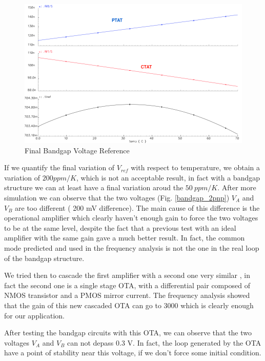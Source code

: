 \documentclass[11pt,a4paper]{report}
\begin{document}
\begin{figure}[h]
  \begin{center}
    \includegraphics[scale=0.4]{photo/PTAT_CTAT_F}
  \end{center}
  \caption{Final Bandgap Voltage Reference}
\end{figure} 

If we quantify the final variation of $V_{ref}$ with respect to temperature, we obtain a variation of $200 ppm/K$, which is not an acceptable result, in fact with a bandgap structure we can at least have a final variation aroud the $50~ppm/K$.
After more simulation we can observe that the two voltages (Fig. \ref{bandgap_2pnp}) $V_A$ and $V_B$ are too different  ( 200 mV difference). The main cause of this difference is the operational amplifier which clearly haven't enough gain to force the two voltages to be at the same level, despite the fact that a previous test with an ideal amplifier with the same gain gave a much better result. In fact, the common mode predicted and used in the frequency analysis is not the one in the real loop of the bandgap structure.

We tried then to cascade the first amplifier with a second one very similar , in fact the second one is a single stage OTA, with a differential pair composed of NMOS transistor and a PMOS mirror current. The frequency analysis showed that the gain of this new cascaded OTA can go to 3000 which is clearly enough for our application.

After testing the bandgap circuits with this OTA, we can observe that the two voltages $V_A$ and $V_B$ can not depass 0.3 V. In fact, the loop generated by the OTA have a point of stability near this voltage, if we don't force some initial condition. 
\end{document}
